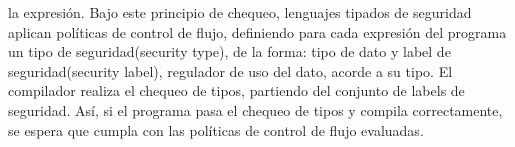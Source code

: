 la expresión.
Bajo este principio de chequeo, lenguajes tipados de seguridad aplican
políticas de control de flujo, definiendo para cada expresión del programa un
tipo de seguridad(security type), de la forma:  tipo de dato y label de
seguridad(security label), regulador de uso del dato, acorde a su tipo. El
compilador realiza el chequeo de tipos, partiendo del conjunto de labels de
seguridad. Así, si el programa pasa el chequeo de tipos y compila correctamente,
se espera que cumpla con las políticas de control de flujo evaluadas.